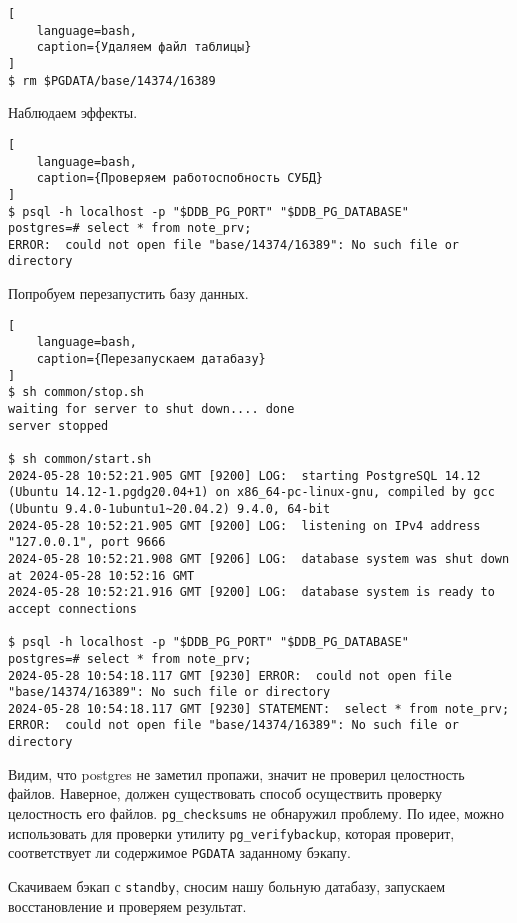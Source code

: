 \documentclass{article}
\begin{document}
\begin{lstlisting}[
    language=bash,
    caption={Удаляем файл таблицы}
]
$ rm $PGDATA/base/14374/16389

\end{lstlisting}

Наблюдаем эффекты.

\begin{lstlisting}[
    language=bash,
    caption={Проверяем работоспобность СУБД}
]
$ psql -h localhost -p "$DDB_PG_PORT" "$DDB_PG_DATABASE"
postgres=# select * from note_prv;
ERROR:  could not open file "base/14374/16389": No such file or directory
\end{lstlisting}

Попробуем перезапустить базу данных.

\begin{lstlisting}[
    language=bash,
    caption={Перезапускаем датабазу}
]
$ sh common/stop.sh
waiting for server to shut down.... done
server stopped

$ sh common/start.sh
2024-05-28 10:52:21.905 GMT [9200] LOG:  starting PostgreSQL 14.12 (Ubuntu 14.12-1.pgdg20.04+1) on x86_64-pc-linux-gnu, compiled by gcc (Ubuntu 9.4.0-1ubuntu1~20.04.2) 9.4.0, 64-bit
2024-05-28 10:52:21.905 GMT [9200] LOG:  listening on IPv4 address "127.0.0.1", port 9666
2024-05-28 10:52:21.908 GMT [9206] LOG:  database system was shut down at 2024-05-28 10:52:16 GMT
2024-05-28 10:52:21.916 GMT [9200] LOG:  database system is ready to accept connections

$ psql -h localhost -p "$DDB_PG_PORT" "$DDB_PG_DATABASE"
postgres=# select * from note_prv;
2024-05-28 10:54:18.117 GMT [9230] ERROR:  could not open file "base/14374/16389": No such file or directory
2024-05-28 10:54:18.117 GMT [9230] STATEMENT:  select * from note_prv;
ERROR:  could not open file "base/14374/16389": No such file or directory
\end{lstlisting}

Видим, что postgres не заметил пропажи, значит не проверил целостность файлов. Наверное, должен существовать способ осуществить проверку целостность его файлов. \texttt{pg\_checksums} не обнаружил проблему. По идее, можно использовать для проверки утилиту \texttt{pg\_verifybackup}, которая проверит, соответствует ли содержимое \texttt{PGDATA} заданному бэкапу.

Скачиваем бэкап с \texttt{standby}, сносим нашу больную датабазу, запускаем восстановление и проверяем результат.
\end{document}
